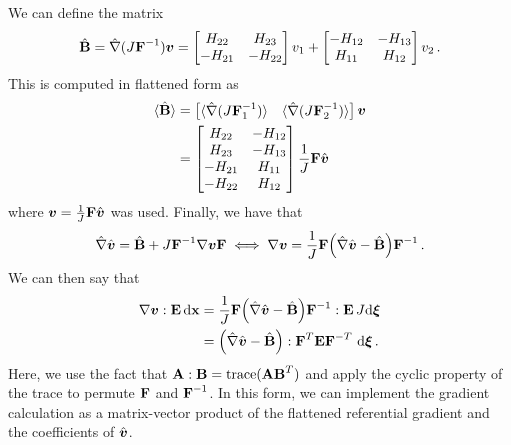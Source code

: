 \documentclass[../doc.tex]{subfiles}
\begin{document}
We can define the matrix 
	\begin{equation} \label{fem:bmat_parts}
		\hat{\mat{B}} = \hnabla(J\mat{F}^{-1}) \vec{v} = \begin{bmatrix} 
			H_{22} & H_{23} \\ -H_{21} & -H_{22}
		\end{bmatrix} v_1 + 
		\begin{bmatrix} 
			-H_{12} & -H_{13} \\ H_{11} & H_{12} 
		\end{bmatrix} v_2 \,. 
	\end{equation}
This is computed in flattened form as 
	\begin{equation} \label{fem:bhat_flat}
	\begin{aligned}
		\ang{\hat{\mat{B}}} &= \begin{bmatrix} 
			\ang{\hnabla(J\F_1^{-1})} & \ang{\hnabla(J\F_2^{-1})}
		\end{bmatrix} \vec{v} \\
		&= \begin{bmatrix} 
			H_{22} & -H_{12} \\ H_{23} & -H_{13} \\ -H_{21} & H_{11} \\ -H_{22} & H_{12} 
		\end{bmatrix} \frac{1}{J}\F\hvec{v} 
	\end{aligned}
	\end{equation}
where $\vec{v} = \frac{1}{J}\F\hvec{v}$ was used. Finally, we have that 
	\begin{equation}
		\hnabla \hvec{v} = \hat{\mat{B}} + J \F^{-1} \nabla\vec{v} \F \iff \nabla\vec{v} = \frac{1}{J}\F\!\paren{\hnabla\hvec{v} - \hat{\mat{B}}}\!\F^{-1} \,. 
	\end{equation}
We can then say that 
	\begin{equation} \label{fem:nablaE_trans}
	\begin{aligned}
		\nabla\vec{v} : \E \ud \x &= \frac{1}{J}\F\!\paren{\hnabla\hvec{v} - \hat{\mat{B}}}\!\F^{-1} : \E \, J \!\ud \vec{\xi} \\
		&= \paren{\hnabla\hvec{v} - \hat{\mat{B}}} : \F^{T} \E \F^{-T} \,\ud\vec{\xi} \,. 
	\end{aligned}
	\end{equation}
Here, we use the fact that $\mat{A} : \mat{B} = \tr(\mat{A}\mat{B}^T)$ and apply the cyclic property of the trace to permute $\mat{F}$ and $\mat{F}^{-1}$. 
In this form, we can implement the gradient calculation as a matrix-vector product of the flattened referential gradient and the coefficients of $\hvec{v}$. 
\end{document}
